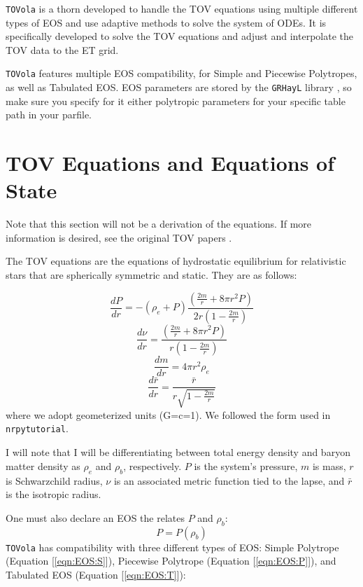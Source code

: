 {\tt TOVola} is a thorn developed to handle the TOV equations using multiple different types of EOS and use adaptive methods to solve the system of ODEs. It is specifically developed to solve the TOV equations and adjust and interpolate the TOV data to the ET grid.

{\tt TOVola} features multiple EOS compatibility, for Simple and Piecewise Polytropes, as well as Tabulated EOS. EOS parameters are stored by the {\tt GRHayL} library \cite{GRHayL}, so make sure you specify for it either polytropic parameters for your specific table path in your parfile.

\section{TOV Equations and Equations of State}

Note that this section will not be a derivation of the equations. If more information is desired, see the original TOV papers \cite{Tolman, OppVol}.

The TOV equations are the equations of hydrostatic equilibrium for relativistic stars that are spherically symmetric and static. They are as follows:

\begin{equation}\label{eqn:TOVdP}
\frac{dP}{dr} = -(\rho_e+P)\frac{(\frac{2m}{r}+8\pi r^2P)}{2r(1-\frac{2m}{r})}
\end{equation}
\begin{equation}\label{eqn:TOVdnu}
\frac{d\nu}{dr} = \frac{(\frac{2m}{r}+8\pi r^2P)}{r(1-\frac{2m}{r})}
\end{equation}
\begin{equation}\label{eqn:TOVdM}
\frac{dm}{dr} = 4\pi r^2 \rho_e
\end{equation}
\begin{equation}\label{eqn:TOVdrbar}
\frac{d\bar{r}}{dr} = \frac{\bar{r}}{r\sqrt{1-\frac{2m}{r}}}
\end{equation}
where we adopt geometerized units (G=c=1). We followed the form used in {\tt nrpytutorial}.\cite{NRpy}

I will note that I will be differentiating between total energy density and baryon matter density as $\rho_e$ and $\rho_b$, respectively. $P$ is the system's pressure, $m$ is mass, $r$ is Schwarzchild radius, $\nu$ is an associated metric function tied to the lapse, and $\bar{r}$ is the isotropic radius.

One must also declare an EOS the relates $P$ and $\rho_b$:
\begin{equation}\label{eqn:EOS}
P=P(\rho_b)
\end{equation}
{\tt TOVola} has compatibility with three different types of EOS: Simple Polytrope (Equation [\ref{eqn:EOS:S}]), Piecewise Polytrope (Equation [\ref{eqn:EOS:P}]), and Tabulated EOS (Equation [\ref{eqn:EOS:T}]):

